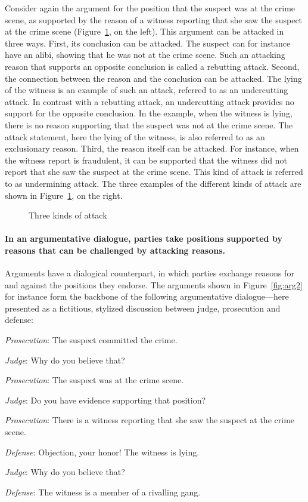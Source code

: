 \documentclass[10pt]{article}
\begin{document}
Consider again the argument for the position that the suspect was at the crime scene, as supported by the reason of a witness reporting that she saw the suspect at the crime scene (Figure~\ref{fig:arg3}, on the left). This argument can be attacked in three ways. First, its conclusion can be attacked. The suspect can for instance have an alibi, showing that he was not at the crime scene. Such an attacking reason that supports an opposite conclusion is called a rebutting attack. Second, the connection between the reason and the conclusion can be attacked. The lying of the witness is an example of such an attack, referred to as an undercutting attack. In contrast with a rebutting attack, an undercutting attack provides no support for the opposite conclusion. In the example, when the witness is lying, there is no reason supporting that the suspect was not at the crime scene. The attack statement, here the lying of the witness, is also referred to as an exclusionary reason. Third, the reason itself can be attacked. For instance, when the witness report is fraudulent, it can be supported that the witness did not report that she saw the suspect at the crime scene. This kind of attack is referred to as undermining attack. The three examples of the different kinds of attack are shown in Figure~\ref{fig:arg3}, on the right.


\begin{figure}[bt]
\centering

\caption{Three kinds of attack\label{fig:arg3}}
\end{figure}

\paragraph{In an argumentative dialogue, parties take positions supported by reasons that can be challenged by attacking reasons.}

Arguments have a dialogical counterpart, in which parties exchange reasons for and against the positions they endorse. The arguments shown in Figure~\ref{fig:arg2} for instance form the backbone of the following argumentative dialogue---here presented as a fictitious, stylized discussion between judge, prosecution and defense:

\begin{description}
	\item \emph{Prosecution}: The suspect committed the crime.
	\item \emph{Judge}: Why do you believe that?
	\item \emph{Prosecution}: The suspect was at the crime scene.
	\item \emph{Judge}: Do you have evidence supporting that position?
	\item \emph{Prosecution}: There is a witness reporting that she saw the suspect at the crime scene.
	\item \emph{Defense}: Objection, your honor! The witness is lying.
	\item \emph{Judge}: Why do you believe that?
	\item \emph{Defense}: The witness is a member of a rivalling gang.
\end{description}
\end{document}
